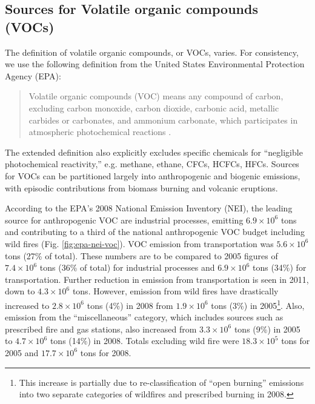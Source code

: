 \subsection{Sources for Volatile organic compounds (VOCs)} \label{ssec:intro/ozone/voc}

	The definition of volatile organic compounds, or VOCs, varies. For consistency, we use the following definition from the United States Environmental Protection Agency (EPA):
	\begin{quotation}
		Volatile organic compounds (VOC) means any compound of carbon, excluding carbon monoxide, carbon dioxide, carbonic acid, metallic carbides or carbonates, and ammonium carbonate, which participates in atmospheric photochemical reactions \citep{EPA:2012qy}.
	\end{quotation}
	The extended definition also explicitly excludes specific chemicals for ``negligible photochemical reactivity,'' e.g. methane, ethane, CFCs, HCFCs, HFCs. Sources for VOCs can be partitioned largely into anthropogenic and biogenic emissions, with episodic contributions from biomass burning and volcanic eruptions.


	According to the EPA's 2008 National Emission Inventory (NEI), the leading source for anthropogenic VOC are industrial processes, emitting $6.9\times10^6$ tons and contributing to a third of the national anthropogenic VOC budget including wild fires (Fig. \ref{fig:epa-nei-voc}). VOC emission from transportation was $5.6\times10^6$ tons (27\% of total). These numbers are to be compared to 2005 figures of $7.4\times10^6$ tons (36\% of total) for industrial processes and $6.9\times10^6$ tons (34\%) for transportation. Further reduction in emission from transportation is seen in 2011, down to $4.3\times10^6$ tons. However, emission from wild fires have drastically increased to $2.8\times10^6$ tons (4\%) in 2008 from $1.9\times10^6$ tons (3\%) in 2005\footnote{This increase is partially due to re-classification of ``open burning'' emissions into two separate categories of wildfires and prescribed burning in 2008.}. Also, emission from the ``miscellaneous'' category, which includes sources such as prescribed fire and gas stations, also increased from $3.3\times10^6$ tons (9\%) in 2005 to $4.7\times10^6$ tons (14\%) in 2008. Totals excluding wild fire were $18.3\times10^5$ tons for 2005 and $17.7\times10^6$ tons for 2008.

